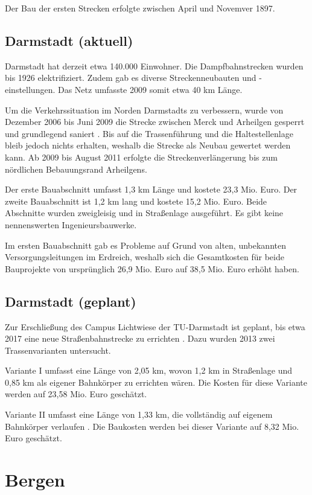 Der Bau der ersten Strecken erfolgte zwischen April und Novemver 1897.

\subsection*{Darmstadt (aktuell)}

Darmstadt hat derzeit etwa 140.000 Einwohner. Die Dampfbahnstrecken wurden bis
1926 elektrifiziert. Zudem gab es diverse Streckenneubauten und
-einstellungen. Das Netz umfasste 2009 somit etwa 40 km Länge.

Um die Verkehrssituation im Norden Darmstadts zu verbessern, wurde von Dezember
2006 bis Juni 2009 die Strecke zwischen Merck und Arheilgen gesperrt und
grundlegend saniert \cite{eoDaAr1}.  Bis auf die Trassenführung und die
Haltestellenlage bleib jedoch nichts erhalten, weshalb die Strecke als Neubau
gewertet werden kann. Ab 2009 bis August 2011 erfolgte die Streckenverlängerung
bis zum nördlichen Bebauungsrand Arheilgens. \cite{eoDaAr2} \cite{eoDaAr3}

Der erste Bauabschnitt umfasst 1,3 km Länge und kostete 23,3 Mio. Euro. Der
zweite Bauabschnitt ist 1,2 km lang und kostete 15,2 Mio. Euro. Beide Abschnitte
wurden zweigleisig und in Straßenlage ausgeführt. Es gibt keine nennenswerten
Ingenieursbauwerke.

Im ersten Bauabschnitt gab es Probleme auf Grund von alten, unbekannten
Versorgungsleitungen im Erdreich, weshalb sich die Gesamtkosten für beide
Bauprojekte von ursprünglich 26,9 Mio. Euro auf 38,5 Mio. Euro erhöht haben.

\subsection*{Darmstadt (geplant)}

Zur Erschließung des Campus Lichtwiese der TU-Darmstadt ist geplant, bis etwa
2017 eine neue Straßenbahnstrecke zu errichten \cite{mrDaLw}. Dazu wurden 2013
zwei Trassenvarianten untersucht.

Variante I umfasst eine Länge von 2,05 km, wovon 1,2 km in Straßenlage und 0,85
km als eigener Bahnkörper zu errichten wären. Die Kosten für diese Variante
werden auf 23,58 Mio.  Euro geschätzt.

Variante II umfasst eine Länge von 1,33 km, die vollständig auf eigenem
Bahnkörper verlaufen \cite{eoDaLw}.  Die Baukosten werden bei dieser Variante
auf 8,32 Mio. Euro geschätzt.

\section{Bergen}

